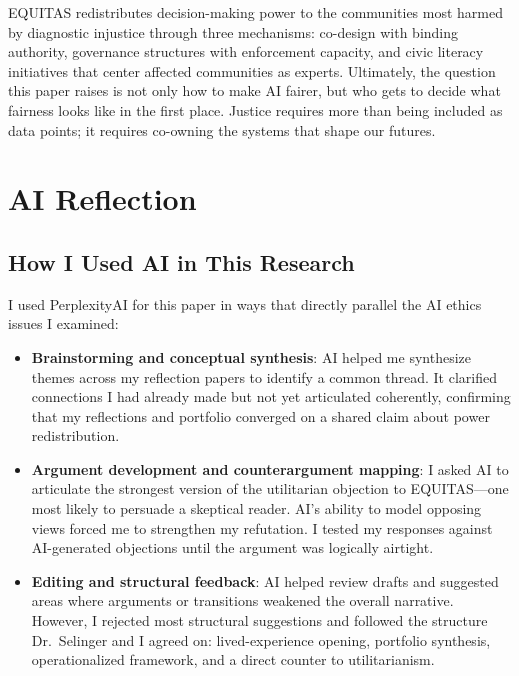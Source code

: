 \documentclass[12pt,a4paper]{article}
\begin{document}
\vspace{0.5em}
EQUITAS redistributes decision-making power to the communities most harmed by diagnostic injustice through three mechanisms: co-design with binding authority, governance structures with enforcement capacity, and civic literacy initiatives that center affected communities as experts. Ultimately, the question this paper raises is not only how to make AI fairer, but who gets to decide what fairness looks like in the first place. Justice requires more than being included as data points; it requires co-owning the systems that shape our futures.



\newpage
\section{AI Reflection}

\subsection{How I Used AI in This Research}

I used PerplexityAI for this paper in ways that directly parallel the AI ethics issues I examined:

\begin{itemize}
    \setlength\itemsep{0.1em}
    \item \textbf{Brainstorming and conceptual synthesis}: AI helped me synthesize themes across my reflection papers to identify a common thread. It clarified connections I had already made but not yet articulated coherently, confirming that my reflections and portfolio converged on a shared claim about power redistribution.
    
    \item \textbf{Argument development and counterargument mapping}: I asked AI to articulate the strongest version of the utilitarian objection to EQUITAS—one most likely to persuade a skeptical reader. AI’s ability to model opposing views forced me to strengthen my refutation. I tested my responses against AI-generated objections until the argument was logically airtight.
    
    \item \textbf{Editing and structural feedback}: AI helped review drafts and suggested areas where arguments or transitions weakened the overall narrative. However, I rejected most structural suggestions and followed the structure Dr.\ Selinger and I agreed on: lived-experience opening, portfolio synthesis, operationalized framework, and a direct counter to utilitarianism.
\end{itemize}
\end{document}

